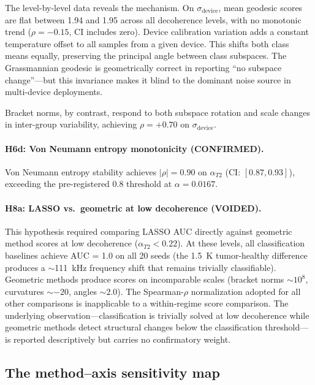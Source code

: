 \documentclass[11pt]{article}
\begin{document}
The level-by-level data reveals the mechanism.
On $\sigma_\text{device}$, mean geodesic scores are flat between 1.94
and 1.95 across all decoherence levels, with no monotonic trend
($\rho = -0.15$, CI includes zero).
Device calibration variation adds a constant temperature offset to all
samples from a given device.  This shifts both class means equally,
preserving the principal angle between class subspaces.  The
Grassmannian geodesic is geometrically correct in reporting ``no
subspace change''---but this invariance makes it blind to the dominant
noise source in multi-device deployments.

Bracket norms, by contrast, respond to both subspace rotation and
scale changes in inter-group variability, achieving $\rho = +0.70$
on $\sigma_\text{device}$.

\paragraph{H6d: Von Neumann entropy monotonicity (CONFIRMED).}
Von Neumann entropy stability achieves $|\rho| = 0.90$ on
$\alpha_{T2}$ (CI: $[0.87, 0.93]$), exceeding the pre-registered
0.8 threshold at $\alpha = 0.0167$.

\paragraph{H8a: LASSO vs.\ geometric at low decoherence (VOIDED).}
\label{sec:deviation-h8a}
This hypothesis required comparing LASSO AUC directly against geometric
method scores at low decoherence ($\alpha_{T2} < 0.22$).  At these
levels, all classification baselines achieve AUC = 1.0 on all 20 seeds
(the 1.5~K tumor-healthy difference produces a $\sim$111~kHz frequency
shift that remains trivially classifiable).  Geometric methods produce
scores on incomparable scales (bracket norms $\sim 10^8$, curvatures
$\sim -20$, angles $\sim 2.0$).  The Spearman-$\rho$ normalization
adopted for all other comparisons is inapplicable to a within-regime
score comparison.  The underlying observation---classification is
trivially solved at low decoherence while geometric methods detect
structural changes below the classification threshold---is reported
descriptively but carries no confirmatory weight.

\subsection{The method--axis sensitivity map}
\end{document}
